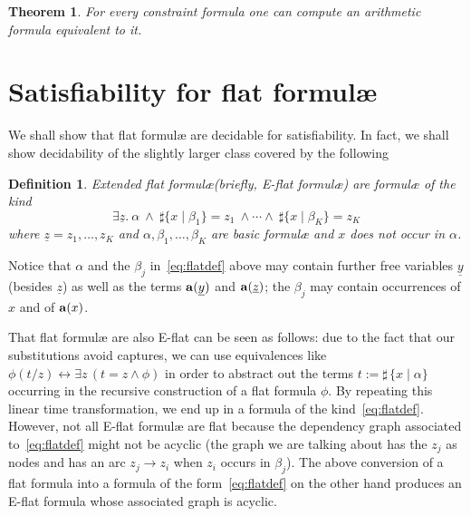 \documentclass[11pt,a4paper]{article}
\newcommand{\formulae}{formul\ae\xspace}
\newcommand{\uy}{\ensuremath{\underline y}}
\newcommand{\uz}{\ensuremath{\underline z}}
\newcommand{\ta}{\ensuremath{{\bf a}}\xspace}
\newtheorem{theorem}{Theorem}
\newtheorem{definition}{Definition}
\begin{document}
\begin{theorem}\label{thm:NS}
 For every constraint formula one can compute an arithmetic formula equivalent to it.
\end{theorem} 
 






\section{Satisfiability for flat \formulae}\label{sec:sat}

We shall show that flat \formulae are decidable for satisfiability. In fact, we shall show decidability of the slightly
larger class covered by the following

\begin{definition}
Extended flat \formulae (briefly, E-flat \formulae) are \formulae of the kind
   \begin{equation}\label{eq:flatdef}
\exists \uz.~\alpha~ \wedge~ \sharp\{x\mid \beta_1\} =z_1~\wedge \cdots \wedge~ \sharp\{x\mid \beta_K\} =z_K
\end{equation}
where $\uz=z_1, \dots, z_K$ and $\alpha,\beta_1, \dots, \beta_K$ are basic \formulae and $x$ does not occur in $\alpha$.
\end{definition}

Notice that 
$\alpha$ and the $\beta_j$ in~\eqref{eq:flatdef} above 
may contain
further free variables $\uy$ (besides $\uz$) as well as the terms  $\ta(\uy)$ and $\ta(\uz)$; the $\beta_j$ may contain occurrences of $x$ and of $\ta(x)$.

 That 
flat \formulae are also E-flat  can be seen 
as follows: due to the fact that our substitutions avoid captures, we can use equivalences like 
 $\phi(t/z)\leftrightarrow \exists z\,(t=z \wedge \phi)$  
 in order to abstract out the terms $t:=\sharp\,\{x\!\mid\! \alpha\}$ occurring in the recursive construction of a flat  formula
 $\phi$. By repeating this  
linear time transformation, we end up in a formula of the kind~\eqref{eq:flatdef}. However, not all E-flat \formulae are flat because
the dependency graph associated to~\eqref{eq:flatdef}  might not be acyclic (the graph we are talking about has the $z_j$ as nodes and has
an arc $z_j\to z_i$ when $z_i$ occurs in $\beta_j$). The above conversion of a flat formula into a formula of the form~\eqref{eq:flatdef} on the other hand produces an E-flat formula whose associated graph is acyclic.
\end{document}

